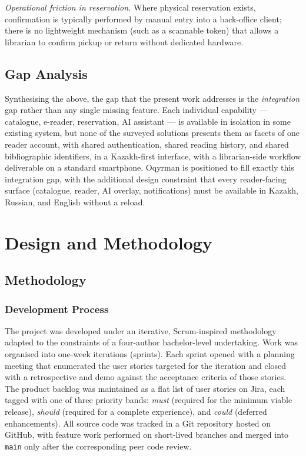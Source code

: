 \documentclass[12pt,a4paper]{report}
\begin{document}
\textit{Operational friction in reservation.} Where physical reservation
exists, confirmation is typically performed by manual entry into a
back-office client; there is no lightweight mechanism (such as a
scannable token) that allows a librarian to confirm pickup or return
without dedicated hardware.

\section{Gap Analysis}

Synthesising the above, the gap that the present work addresses is the
\textit{integration} gap rather than any single missing feature. Each
individual capability --- catalogue, e-reader, reservation, AI assistant
--- is available in isolation in some existing system, but none of the
surveyed solutions presents them as facets of one reader account, with
shared authentication, shared reading history, and shared bibliographic
identifiers, in a Kazakh-first interface, with a librarian-side workflow
deliverable on a standard smartphone. Oqyrman is positioned to fill
exactly this integration gap, with the additional design constraint that
every reader-facing surface (catalogue, reader, AI overlay, notifications)
must be available in Kazakh, Russian, and English without a reload.

\chapter{Design and Methodology}

\section{Methodology}

\subsection{Development Process}

The project was developed under an iterative, Scrum-inspired methodology
adapted to the constraints of a four-author bachelor-level undertaking.
Work was organised into one-week iterations (sprints). Each sprint opened
with a planning meeting that enumerated the user stories targeted for the
iteration and closed with a retrospective and demo against the acceptance
criteria of those stories. The product backlog was maintained as a flat
list of user stories on Jira, each tagged with one of three priority
bands: \textit{must} (required for the minimum viable release),
\textit{should} (required for a complete experience), and \textit{could}
(deferred enhancements). All source code was tracked in a Git repository
hosted on GitHub, with feature work performed on short-lived branches and
merged into \texttt{main} only after the corresponding peer code review.
\end{document}
